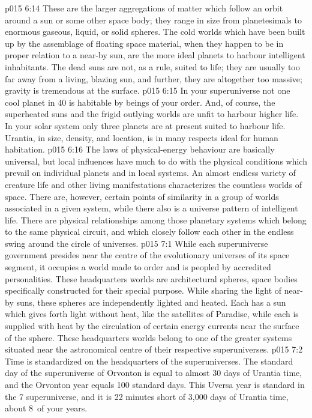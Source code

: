 \vs p015 6:14 \pc {} These are the larger aggregations of matter which follow an orbit around a sun or some other space body; they range in size from planetesimals to enormous gaseous, liquid, or solid spheres. The cold worlds which have been built up by the assemblage of floating space material, when they happen to be in proper relation to a near-by sun, are the more ideal planets to harbour intelligent inhabitants. The dead suns are not, as a rule, suited to life; they are usually too far away from a living, blazing sun, and further, they are altogether too massive; gravity is tremendous at the surface.
\vs p015 6:15 In your superuniverse not one cool planet in 40 is habitable by beings of your order. And, of course, the superheated suns and the frigid outlying worlds are unfit to harbour higher life. In your solar system only three planets are at present suited to harbour life. Urantia, in size, density, and location, is in many respects ideal for human habitation.
\vs p015 6:16 The laws of physical\hyp{}energy behaviour are basically universal, but local influences have much to do with the physical conditions which prevail on individual planets and in local systems. An almost endless variety of creature life and other living manifestations characterizes the countless worlds of space. There are, however, certain points of similarity in a group of worlds associated in a given system, while there also is a universe pattern of intelligent life. There are physical relationships among those planetary systems which belong to the same physical circuit, and which closely follow each other in the endless swing around the circle of universes.
\vs p015 7:1 While each superuniverse government presides near the centre of the evolutionary universes of its space segment, it occupies a world made to order and is peopled by accredited personalities. These headquarters worlds are architectural spheres, space bodies specifically constructed for their special purpose. While sharing the light of near-by suns, these spheres are independently lighted and heated. Each has a sun which gives forth light without heat, like the satellites of Paradise, while each is supplied with heat by the circulation of certain energy currents near the surface of the sphere. These headquarters worlds belong to one of the greater systems situated near the astronomical centre of their respective superuniverses.
\vs p015 7:2 \pc Time is standardized on the headquarters of the superuniverses. The standard day of the superuniverse of Orvonton is equal to almost 30 days of Urantia time, and the Orvonton year equals 100 standard days. This Uversa year is standard in the 7 superuniverse, and it is 22 minutes short of 3,000 days of Urantia time, about 8\, of your years.
